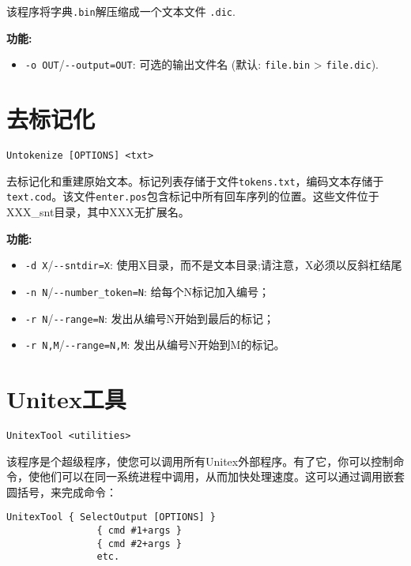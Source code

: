 \bigskip
\noindent 该程序将字典\verb+.bin+解压缩成一个文本文件
\verb+.dic+.

\bigskip
\noindent \textbf{功能:}
\begin{itemize}
\item \verb+-o OUT+/\verb+--output=OUT+: 可选的输出文件名 (默认:
  \verb+file.bin+ > \verb+file.dic+).
\end{itemize}








\section{去标记化}
\label{section-Untokenize}
\verb+Untokenize [OPTIONS] <txt>+

\bigskip
\noindent 去标记化和重建原始文本。标记列表存储于文件\verb+tokens.txt+，编码文本存储于\verb+text.cod+。该文件\verb+enter.pos+包含标记中所有回车序列的位置。这些文件位于 XXX\_snt目录，其中XXX无扩展名。

\bigskip
\noindent \textbf{功能:}
\begin{itemize}

\item \verb+-d X+/\verb+--sntdir=X+: 使用X目录，而不是文本目录;请注意，X必须以反斜杠结尾
\item \verb+-n N+/\verb+--number_token=N+: 给每个N标记加入编号；
\item \verb+-r N+/\verb+--range=N+: 发出从编号N开始到最后的标记；
  \item \verb+-r N,M+/\verb+--range=N,M+: 发出从编号N开始到M的标记。
\end{itemize}








\section{Unitex工具}
\label{section-UnitexTool}
\verb+UnitexTool <utilities>+

\bigskip
\noindent 该程序是个超级程序，使您可以调用所有Unitex外部程序。有了它，你可以控制命令，使他们可以在同一系统进程中调用，从而加快处理速度。这可以通过调用嵌套圆括号，来完成命令：
 
\bigskip
\begin{verbatim}
UnitexTool { SelectOutput [OPTIONS] } 
                { cmd #1+args } 
                { cmd #2+args }
                etc.
\end{verbatim}

